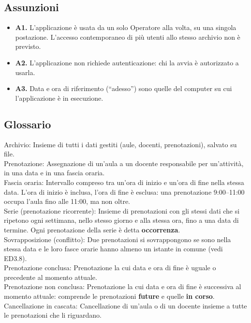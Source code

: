 \subsection{Assunzioni}
\begin{itemize}
\item \textbf{A1.} L'applicazione è usata da un solo Operatore alla volta, su una singola postazione. L'accesso contemporaneo di più utenti allo stesso archivio non è previsto.
\item \textbf{A2.} L'applicazione non richiede autenticazione: chi la avvia è autorizzato a usarla.
\item \textbf{A3.} Data e ora di riferimento (``adesso'') sono quelle del computer su cui l'applicazione è in esecuzione.
\end{itemize}

\subsection{Glossario}
Archivio: Insieme di tutti i dati gestiti (aule, docenti, prenotazioni), salvato su file.\\
Prenotazione: Assegnazione di un'aula a un docente responsabile per un'attività, in una data e in una fascia oraria.\\
Fascia oraria: Intervallo compreso tra un'ora di inizio e un'ora di fine nella stessa data. L'ora di inizio è inclusa, l'ora di fine è esclusa: una prenotazione 9:00–11:00 occupa l'aula fino alle 11:00, ma non oltre.\\
Serie (prenotazione ricorrente): Insieme di prenotazioni con gli stessi dati che si ripetono ogni settimana, nello stesso giorno e alla stessa ora, fino a una data di termine. Ogni prenotazione della serie è detta \textbf{occorrenza}.\\
Sovrapposizione (conflitto): Due prenotazioni si sovrappongono se sono nella stessa data e le loro fasce orarie hanno almeno un istante in comune (vedi ED3.8).\\
Prenotazione conclusa: Prenotazione la cui data e ora di fine è uguale o precedente al momento attuale.\\
Prenotazione non conclusa: Prenotazione la cui data e ora di fine è successiva al momento attuale: comprende le prenotazioni \textbf{future} e quelle \textbf{in corso}.\\
Cancellazione in cascata: Cancellazione di un'aula o di un docente insieme a tutte le prenotazioni che li riguardano.\\


